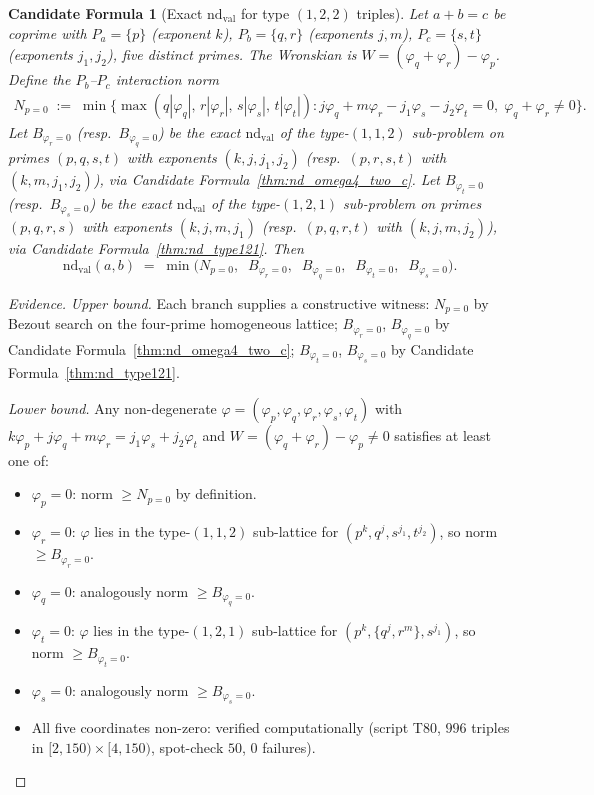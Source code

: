\documentclass[12pt]{article}
\newtheorem{candidate}{Candidate Formula}
\theoremstyle{definition}
\begin{document}
\begin{candidate}[Exact $\mathrm{nd}_{\mathrm{val}}$ for type $(1,2,2)$ triples]\label{thm:nd_type122}
  Let $a + b = c$ be coprime with $P_a = \{p\}$ (exponent $k$),
  $P_b = \{q, r\}$ (exponents $j, m$), $P_c = \{s, t\}$ (exponents $j_1, j_2$),
  five distinct primes.  The Wronskian is $W = (\varphi_q + \varphi_r) - \varphi_p$.
  Define the \emph{$P_b$--$P_c$ interaction norm}
  \begin{align*}
    N_{p=0} \;:=\; \min\bigl\{
      \max(q|\varphi_q|,\,r|\varphi_r|,\,s|\varphi_s|,\,t|\varphi_t|) :
      j\varphi_q + m\varphi_r - j_1\varphi_s - j_2\varphi_t = 0,\;
      \varphi_q + \varphi_r \ne 0\bigr\}.
  \end{align*}
  Let $B_{\varphi_r=0}$ (resp.~$B_{\varphi_q=0}$) be the exact $\mathrm{nd}_{\mathrm{val}}$ of the
  type-$(1,1,2)$ sub-problem on primes $(p,q,s,t)$ with exponents $(k,j,j_1,j_2)$
  (resp.\ $(p,r,s,t)$ with $(k,m,j_1,j_2)$), via Candidate Formula~\ref{thm:nd_omega4_two_c}.
  Let $B_{\varphi_t=0}$ (resp.~$B_{\varphi_s=0}$) be the exact $\mathrm{nd}_{\mathrm{val}}$ of the
  type-$(1,2,1)$ sub-problem on primes $(p,q,r,s)$ with exponents $(k,j,m,j_1)$
  (resp.\ $(p,q,r,t)$ with $(k,j,m,j_2)$), via Candidate Formula~\ref{thm:nd_type121}.  Then
  \[
    \mathrm{nd}_{\mathrm{val}}(a,b) \;=\; \min\!\bigl(
      N_{p=0},\;\;
      B_{\varphi_r=0},\;\;
      B_{\varphi_q=0},\;\;
      B_{\varphi_t=0},\;\;
      B_{\varphi_s=0}
    \bigr).
  \]
\end{candidate}

\begin{proof}[Evidence]
  \textit{Upper bound.}  Each branch supplies a constructive witness:
  $N_{p=0}$ by Bezout search on the four-prime homogeneous lattice;
  $B_{\varphi_r=0}$, $B_{\varphi_q=0}$ by Candidate Formula~\ref{thm:nd_omega4_two_c};
  $B_{\varphi_t=0}$, $B_{\varphi_s=0}$ by Candidate Formula~\ref{thm:nd_type121}.

  \textit{Lower bound.}  Any non-degenerate
  $\varphi = (\varphi_p, \varphi_q, \varphi_r, \varphi_s, \varphi_t)$
  with $k\varphi_p + j\varphi_q + m\varphi_r = j_1\varphi_s + j_2\varphi_t$ and
  $W = (\varphi_q + \varphi_r) - \varphi_p \ne 0$ satisfies at least one of:
  \begin{itemize}
    \item $\varphi_p = 0$: norm $\ge N_{p=0}$ by definition.
    \item $\varphi_r = 0$: $\varphi$ lies in the type-$(1,1,2)$ sub-lattice for
      $(p^k, q^j, s^{j_1}, t^{j_2})$, so norm $\ge B_{\varphi_r=0}$.
    \item $\varphi_q = 0$: analogously norm $\ge B_{\varphi_q=0}$.
    \item $\varphi_t = 0$: $\varphi$ lies in the type-$(1,2,1)$ sub-lattice for
      $(p^k, \{q^j, r^m\}, s^{j_1})$, so norm $\ge B_{\varphi_t=0}$.
    \item $\varphi_s = 0$: analogously norm $\ge B_{\varphi_s=0}$.
    \item All five coordinates non-zero: verified computationally (script T80,
      $996$ triples in $[2,150)\times[4,150)$, spot-check $50$, $0$ failures).
  \end{itemize}
\end{proof}
\end{document}
